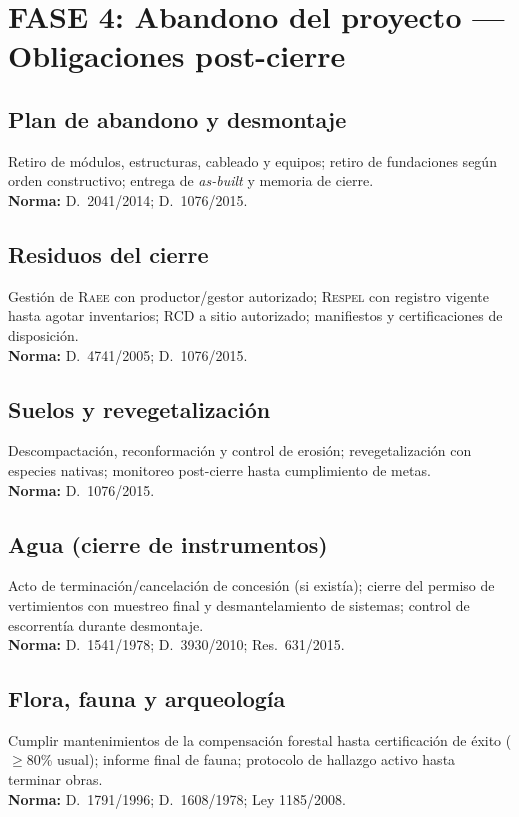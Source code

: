 \section{FASE 4: Abandono del proyecto — Obligaciones post-cierre}

\subsection{Plan de abandono y desmontaje}
Retiro de módulos, estructuras, cableado y equipos; retiro de fundaciones según orden constructivo; entrega de \emph{as-built} y memoria de cierre.\\
\textbf{Norma:} D.~2041/2014; D.~1076/2015.

\subsection{Residuos del cierre}
Gestión de \textsc{Raee} con productor/gestor autorizado; \textsc{Respel} con registro vigente hasta agotar inventarios; RCD a sitio autorizado; manifiestos y certificaciones de disposición.\\
\textbf{Norma:} D.~4741/2005; D.~1076/2015.

\subsection{Suelos y revegetalización}
Descompactación, reconformación y control de erosión; revegetalización con especies nativas; monitoreo post-cierre hasta cumplimiento de metas.\\
\textbf{Norma:} D.~1076/2015.

\subsection{Agua (cierre de instrumentos)}
Acto de terminación/cancelación de concesión (si existía); cierre del permiso de vertimientos con muestreo final y desmantelamiento de sistemas; control de escorrentía durante desmontaje.\\
\textbf{Norma:} D.~1541/1978; D.~3930/2010; Res.~631/2015.

\subsection{Flora, fauna y arqueología}
Cumplir mantenimientos de la compensación forestal hasta certificación de éxito ($\geq$80\% usual); informe final de fauna; protocolo de hallazgo activo hasta terminar obras.\\
\textbf{Norma:} D.~1791/1996; D.~1608/1978; Ley 1185/2008.


